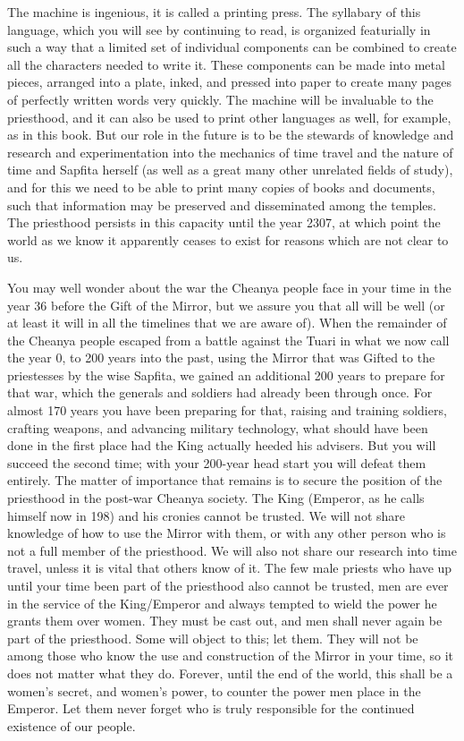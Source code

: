 \documentclass{article}
\begin{document}
The machine is ingenious, it is called a printing press.  The syllabary of this language, which you will see by continuing to read, is organized featurially in such a way that a limited set of individual components can be combined to create all the characters needed to write it.  These components can be made into metal pieces, arranged into a plate, inked, and pressed into paper to create many pages of perfectly written words very quickly.  The machine will be invaluable to the priesthood, and it can also be used to print other languages as well, for example, as in this book.  But our role in the future is to be the stewards of knowledge and research and experimentation into the mechanics of time travel and the nature of time and Sapfita herself (as well as a great many other unrelated fields of study), and for this we need to be able to print many copies of books and documents, such that information may be preserved and disseminated among the temples.  The priesthood persists in this capacity until the year 2307, at which point the world as we know it apparently ceases to exist for reasons which are not clear to us.

You may well wonder about the war the Cheanya people face in your time in the year 36 before the Gift of the Mirror, but we assure you that all will be well (or at least it will in all the timelines that we are aware of).  When the remainder of the Cheanya people escaped from a battle against the Tuari in what we now call the year 0, to 200 years into the past, using the Mirror that was Gifted to the priestesses by the wise Sapfita, we gained an additional 200 years to prepare for that war, which the generals and soldiers had already been through once.  For almost 170 years you have been preparing for that, raising and training soldiers, crafting weapons, and advancing military technology, what should have been done in the first place had the King actually heeded his advisers.  But you will succeed the second time; with your 200-year head start you will defeat them entirely.  The matter of importance that remains is to secure the position of the priesthood in the post-war Cheanya society.  The King (Emperor, as he calls himself now in 198) and his cronies cannot be trusted.  We will not share knowledge of how to use the Mirror with them, or with any other person who is not a full member of the priesthood.  We will also not share our research into time travel, unless it is vital that others know of it.  The few male priests who have up until your time been part of the priesthood also cannot be trusted, men are ever in the service of the King/Emperor and always tempted to wield the power he grants them over women.  They must be cast out, and men shall never again be part of the priesthood.  Some will object to this; let them.  They will not be among those who know the use and construction of the Mirror in your time, so it does not matter what they do.  Forever, until the end of the world, this shall be a women's secret, and women's power, to counter the power men place in the Emperor.  Let them never forget who is truly responsible for the continued existence of our people.
\end{document}
